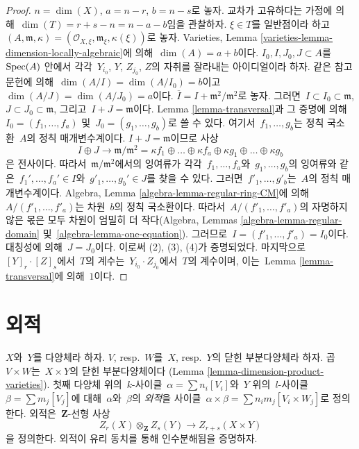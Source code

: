 \begin{proof}
$n = \dim(X)$, $a = n - r$, $b = n - s$로 놓자. 교차가 고유하다는
가정에 의해\  $\dim(T) = r + s - n = n - a - b$임을 관찰하자.
$\xi \in T$를 일반점이라 하고\ 
$(A, \mathfrak m, \kappa) =
(\mathcal{O}_{X, \xi}, \mathfrak m_\xi, \kappa(\xi))$로 놓자.
Varieties, Lemma \ref{varieties-lemma-dimension-locally-algebraic}에 의해\ 
$\dim(A) = a + b$이다.
$I_0, I, J_0, J \subset A$를\  $\mathop{\mathrm{Spec}}(A)$ 안에서 각각\ 
$Y_{i_0}$, $Y$, $Z_{j_0}$, $Z$의 자취를 잘라내는 아이디얼이라 하자.
같은 참고문헌에 의해\ 
$\dim(A/I) = \dim(A/I_0) = b$이고\  $\dim(A/J) = \dim(A/J_0) = a$이다.
$\overline{I} = I + \mathfrak m^2/\mathfrak m^2$로 놓자.
그러면\  $I \subset I_0 \subset \mathfrak m$,
$J \subset J_0 \subset \mathfrak m$, 그리고\  $I + J = \mathfrak m$이다.
Lemma \ref{lemma-transversal}과 그 증명에 의해\ 
$I_0 = (f_1, \ldots, f_a)$ 및\  $J_0 = (g_1, \ldots, g_b)$로 쓸 수 있다.
여기서\  $f_1, \ldots, g_b$는 정칙 국소환\  $A$의 정칙 매개변수계이다.
$I + J = \mathfrak m$이므로 사상
$$
I \oplus J \to
\mathfrak m/\mathfrak m^2 =
\kappa f_1
\oplus \ldots \oplus
\kappa f_a
\oplus
\kappa g_1
\oplus \ldots \oplus
\kappa g_b
$$
은 전사이다. 따라서\  $\mathfrak m/\mathfrak m^2$에서의 잉여류가 각각\ 
$f_1, \ldots, f_a$와\  $g_1, \ldots, g_b$의 잉여류와 같은\ 
$f_1', \ldots, f_a' \in I$와\  $g'_1, \ldots, g_b' \in J$를 찾을 수 있다.
그러면\  $f'_1, \ldots, g'_b$는\  $A$의 정칙 매개변수계이다.
Algebra, Lemma \ref{algebra-lemma-regular-ring-CM}에 의해\ 
$A/(f'_1, \ldots, f'_a)$는 차원\  $b$의 정칙 국소환이다.
따라서\  $A/(f'_1, \ldots, f'_a)$의 자명하지 않은 몫은 모두 차원이 엄밀히
더 작다(Algebra, Lemmas \ref{algebra-lemma-regular-domain} 및\ 
\ref{algebra-lemma-one-equation}). 그러므로\ 
$I = (f'_1, \ldots, f'_a) = I_0$이다. 대칭성에 의해\  $J = J_0$이다.
이로써 (2), (3), (4)가 증명되었다.
마지막으로\  $[Y]_r \cdot [Z]_s$에서\  $T$의 계수는\ 
$Y_{i_0} \cdot Z_{j_0}$에서\  $T$의 계수이며, 이는\ 
Lemma \ref{lemma-transversal}에 의해\  $1$이다.
\end{proof}



\section{외적}
\label{section-exterior-product}

\noindent
$X$와\  $Y$를 다양체라 하자.
$V$, resp.\ $W$를\  $X$, resp.\ $Y$의 닫힌 부분다양체라 하자.
곱\  $V\times W$는\  $X\times Y$의 닫힌 부분다양체이다
(Lemma \ref{lemma-dimension-product-varieties}).
첫째 다양체 위의\  $k$-사이클\  $\alpha = \sum n_i [V_i]$와\  $Y$ 위의\  $l$-사이클\ 
$\beta = \sum m_j [V_j]$에 대해\  $\alpha$와\  $\beta$의 {\it 외적}을
사이클\  $\alpha \times \beta = \sum n_i m_j [V_i \times W_j]$로 정의한다.
외적은\  $\mathbf{Z}$-선형 사상
$$
Z_r(X) \otimes_\mathbf{Z} Z_s(Y) \longrightarrow Z_{r + s}(X \times Y)
$$
을 정의한다. 외적이 유리 동치를 통해 인수분해됨을 증명하자.

